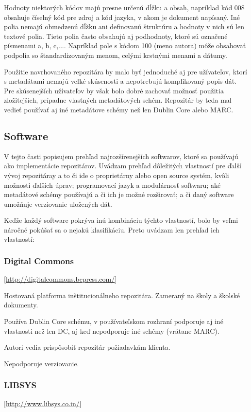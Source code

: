 \documentclass[thesis=M,slovak]{FITthesis}[2013/05/06]
\begin{document}
Hodnoty niektorých kódov majú presne určenú dĺžku a obsah, napríklad kód 008 obsahuje číselný kód pre zdroj a kód jazyka, v akom je dokument napísaný. Iné polia nemajú obmedzenú dĺžku ani definovanú štruktúru a hodnoty v nich sú len textové polia. Tieto polia často obsahujú aj podhodnoty, ktoré sú označené písmenami a, b, c,.... Napríklad pole s kódom 100 (meno autora) môže obsahovať podpolia so štandardizovaným menom, celými krstnými menami a dátumy.\cite[s.~288-291]{witten2009build}

Použitie navrhovaného repozitára by malo byť jednoduché aj pre užívateľov, ktorí s metadátami nemajú veľké skúsenosti a nepotrebujú komplikovaný popis dát. Pre skúsenejších užívateľov by však bolo dobré zachovať možnosť použitia zložitejších, prípadne vlastných metadátových schém. Repozitár by teda mal vedieť používať aj iné metadátove schémy než len Dublin Core alebo MARC.

\subsection{Software}
V tejto časti popisujem prehľad najrozšírenejších softwarov, ktoré sa používajú ako implementácie repozitárov. Uvádzam prehľad dôležitých vlastností pre ďalší vývoj repozitáray a to či ide o proprietárny alebo open source systém, kvôli možnosti ďalších úprav; programovací jazyk a modulárnosť softwaru; aké metadátové schémy používajú a či ich je možné rozširovať; a či daný software umožňuje verziovanie uložených dát.

Keďže každý software pokrýva inú kombináciu týchto vlastností, bolo by veľmi náročné pokúšať sa o nejakú klasifikáciu. Preto uvádzam len prehľad ich vlastností:

\subsubsection {Digital Commons}  [\url{http://digitalcommons.bepress.com/}]

Hostovaná platforma inštitucionálneho repozitára. Zameraný na školy a školské dokumenty.

Používa Dublin Core schému, v používateľskom rozhraní podporuje aj iné vlastnosti než len DC, aj keď nepodporuje iné schémy (vrátane MARC).

Autori vedia prispôsobiť repozitár požiadavkám klienta.

Nepodporuje verziovanie.

\subsubsection {LIBSYS}  [\url{http://www.libsys.co.in/}]
\end{document}
